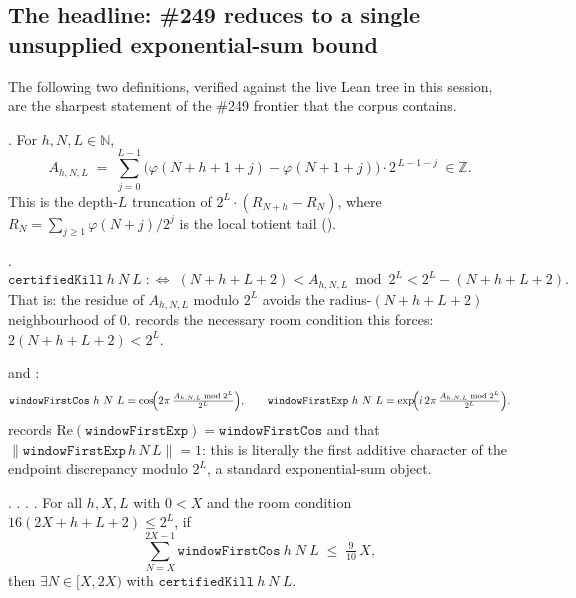\subsection{The headline: \#249 reduces to a single unsupplied exponential-sum bound}
\label{ssec:headline}

The following two definitions, verified against the live Lean tree in this session, are the
sharpest statement of the \#249 frontier that the corpus contains.

\begin{defn}
. For $h,N,L\in\mathbb N$,
\[
  A_{h,N,L} \;=\; \sum_{j=0}^{L-1} \bigl(\varphi(N+h+1+j) - \varphi(N+1+j)\bigr)\cdot 2^{\,L-1-j}
  \ \in \mathbb Z .
\]
This is the depth-$L$ truncation of $2^L\cdot(R_{N+h}-R_N)$, where
$R_N = \sum_{j\ge 1}\varphi(N+j)/2^j$ is the local totient tail
().
\end{defn}

\begin{defn}
.
\[
  \mathtt{certifiedKill}\ h\ N\ L \;:\Leftrightarrow\;
  (N{+}h{+}L{+}2) < A_{h,N,L}\bmod 2^L < 2^L - (N{+}h{+}L{+}2).
\]
That is: the residue of $A_{h,N,L}$ modulo $2^L$ avoids the radius-$(N{+}h{+}L{+}2)$ neighbourhood
of $0$.  records the necessary
room condition this forces: $2(N{+}h{+}L{+}2) < 2^L$.
\end{defn}

\begin{defn}
 and
:
\[
  \mathtt{windowFirstCos}\ h\ N\ L = \cos\!\Bigl(2\pi\,\tfrac{A_{h,N,L}\bmod 2^L}{2^L}\Bigr),\qquad
  \mathtt{windowFirstExp}\ h\ N\ L = \exp\!\Bigl(i\,2\pi\,\tfrac{A_{h,N,L}\bmod 2^L}{2^L}\Bigr).
\]
 records $\mathrm{Re}(\mathtt{windowFirstExp})
= \mathtt{windowFirstCos}$ and  that
$\|\mathtt{windowFirstExp}\,h\,N\,L\| = 1$: this is literally the first additive character of the
endpoint discrepancy modulo $2^L$, a standard exponential-sum object.
\end{defn}

\begin{thm}
\label{thm:hgap-real}
. .
. .
For all $h,X,L$ with $0<X$ and the room condition $16(2X{+}h{+}L{+}2)\le 2^L$, if
\[
  \sum_{N=X}^{2X-1} \mathtt{windowFirstCos}\ h\ N\ L \;\le\; \tfrac{9}{10}\,X ,
\]
then $\exists N\in[X,2X)$ with $\mathtt{certifiedKill}\ h\ N\ L$.
\end{thm}

